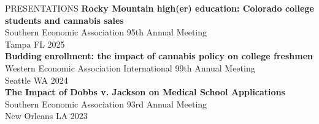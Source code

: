 \documentclass{resume}
\begin{document}
\begin{rSection}{PRESENTATIONS} 
\textbf{Rocky Mountain high(er) education: Colorado college students and cannabis sales}\\
Southern Economic Association 95th Annual Meeting\\
	Tampa FL \hfill 2025 \\
    
\textbf{Budding enrollment: the impact of cannabis policy on college freshmen}\\
Western Economic Association International 99th Annual Meeting\\
	Seattle WA \hfill 2024 \\

 
\textbf{The Impact of Dobbs v. Jackson on Medical School Applications}\\
Southern Economic Association 93rd Annual Meeting\\
	New Orleans LA \hfill 2023 \\

    

	
	
\end{rSection}
\end{document}
